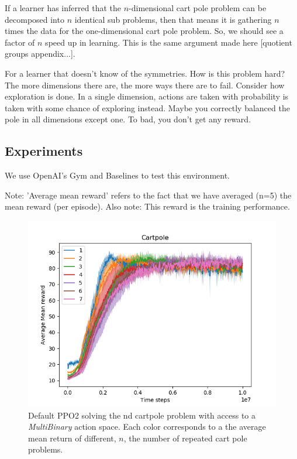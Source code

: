 If a learner has inferred that the $n$-dimensional cart pole problem can be decomposed into $n$ identical sub problems,
then that means it is gathering $n$ times the data for the one-dimensional cart pole problem.
So, we should see a factor of $n$ speed up in learning.
This is the same argument made here [quotient groups appendix...].

For a learner that doesn't know of the symmetries. How is this problem hard?
The more dimensions there are, the more ways there are to fail.
Consider how exploration is done. In a single dimension, actions are taken with probability  is
taken with some chance of exploring instead.
Maybe you correctly balanced the pole in all dimensions except one. To bad, you don't get any reward.

\subsection{Experiments}

We use OpenAI's Gym \cite{Brockman2016} and Baselines \cite{baselines} to test this environment.


Note: 'Average mean reward' refers to the fact that we have averaged (n=5)
the mean reward (per episode). Also note: This reward is the training performance.

\begin{figure}[h!]
  \centering
  \includegraphics[width=1\textwidth,height=0.5\textheight]{../../pictures/figures/multibinary-nd-cart.png}
  \caption{Default PPO2 solving the nd cartpole problem with access to a \textit{MultiBinary} action space. Each color corresponds to a the average mean return of different, $n$, the number of repeated cart pole problems.}
\end{figure}

